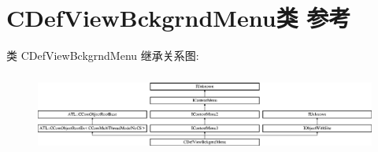 \hypertarget{class_c_def_view_bckgrnd_menu}{}\section{C\+Def\+View\+Bckgrnd\+Menu类 参考}
\label{class_c_def_view_bckgrnd_menu}
类 C\+Def\+View\+Bckgrnd\+Menu 继承关系图\+:\begin{figure}[H]
\begin{center}
\leavevmode
\includegraphics[height=2.651515cm]{class_c_def_view_bckgrnd_menu}
\end{center}
\end{figure}

